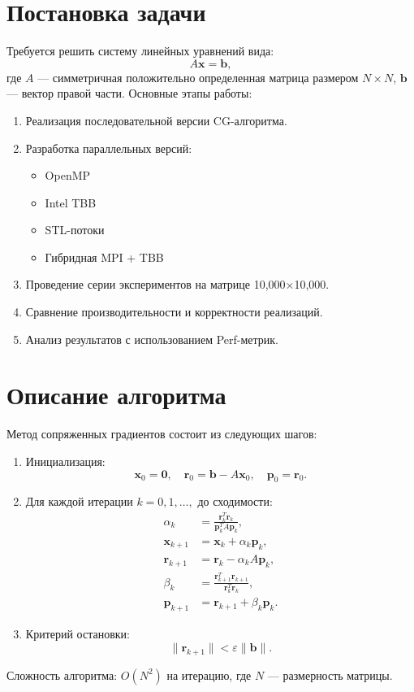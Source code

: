 \documentclass[12pt]{article}
\begin{document}
\section{Постановка задачи}

Требуется решить систему линейных уравнений вида:
\[
A\mathbf{x} = \mathbf{b},
\]
где \(A\) — симметричная положительно определенная матрица размером \(N \times N\), \(\mathbf{b}\) — вектор правой части. Основные этапы работы:
\begin{enumerate}
    \item Реализация последовательной версии CG-алгоритма.
    \item Разработка параллельных версий:
    \begin{itemize}
        \item OpenMP
        \item Intel TBB
        \item STL-потоки
        \item Гибридная MPI + TBB
    \end{itemize}
    \item Проведение серии экспериментов на матрице 10,000×10,000.
    \item Сравнение производительности и корректности реализаций.
    \item Анализ результатов с использованием Perf-метрик.
\end{enumerate}

\section{Описание алгоритма}

Метод сопряженных градиентов состоит из следующих шагов:
\begin{enumerate}
    \item Инициализация:
    \[
    \mathbf{x}_0 = \mathbf{0}, \quad 
    \mathbf{r}_0 = \mathbf{b} - A\mathbf{x}_0, \quad 
    \mathbf{p}_0 = \mathbf{r}_0.
    \]

    \item Для каждой итерации \(k = 0, 1, \dots,\) до сходимости:
    \begin{align*}
        \alpha_k &= \frac{\mathbf{r}_k^T \mathbf{r}_k}{\mathbf{p}_k^T A \mathbf{p}_k}, \\
        \mathbf{x}_{k+1} &= \mathbf{x}_k + \alpha_k \mathbf{p}_k, \\
        \mathbf{r}_{k+1} &= \mathbf{r}_k - \alpha_k A \mathbf{p}_k, \\
        \beta_k &= \frac{\mathbf{r}_{k+1}^T \mathbf{r}_{k+1}}{\mathbf{r}_k^T \mathbf{r}_k}, \\
        \mathbf{p}_{k+1} &= \mathbf{r}_{k+1} + \beta_k \mathbf{p}_k.
    \end{align*}

    \item Критерий остановки: 
    \[
    \|\mathbf{r}_{k+1}\| < \varepsilon \|\mathbf{b}\|.
    \]
\end{enumerate}
Сложность алгоритма: \(O(N^2)\) на итерацию, где \(N\) — размерность матрицы.
\end{document}
